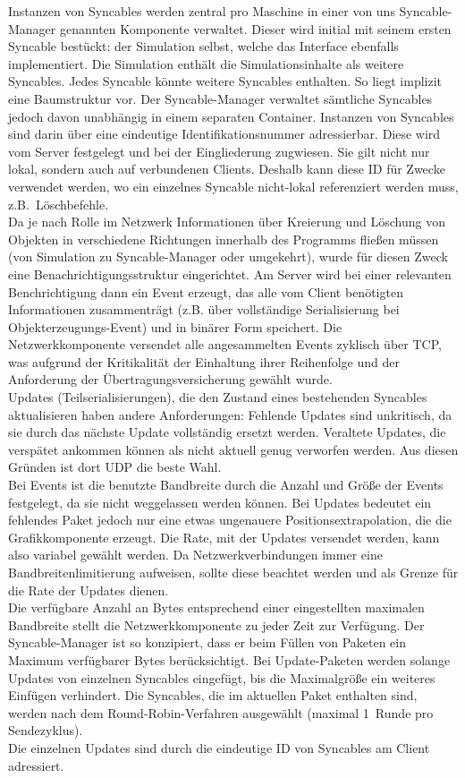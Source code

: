 Instanzen von Syncables werden zentral pro Maschine in einer von uns Syncable-Manager genannten Komponente verwaltet. 
Dieser wird initial mit seinem ersten Syncable bestückt: der Simulation selbst, welche das Interface ebenfalls implementiert. Die Simulation enthält die Simulationsinhalte als weitere Syncables. Jedes Syncable könnte weitere Syncables enthalten. So liegt implizit eine Baumstruktur vor. Der Syncable-Manager verwaltet sämtliche Syncables jedoch davon unabhängig in einem separaten Container. Instanzen von Syncables sind darin über eine eindeutige Identifikationsnummer adressierbar. Diese wird vom Server festgelegt und bei der Eingliederung zugwiesen. Sie gilt nicht nur lokal, sondern auch auf verbundenen Clients. Deshalb kann diese ID für Zwecke verwendet werden, wo ein einzelnes Syncable nicht-lokal referenziert werden muss, z.B.~Löschbefehle.\\
Da je nach Rolle im Netzwerk Informationen über Kreierung und Löschung von Objekten in verschiedene Richtungen innerhalb des Programms fließen müssen (von Simulation zu Syncable-Manager oder umgekehrt), wurde für diesen Zweck eine Benachrichtigungsstruktur eingerichtet. Am Server wird bei einer relevanten Benchrichtigung dann ein Event erzeugt, das alle vom Client benötigten Informationen zusammenträgt (z.B. über vollständige Serialisierung bei Objekterzeugungs-Event) und in binärer Form speichert. Die Netzwerkkomponente versendet alle angesammelten Events zyklisch über TCP, was aufgrund der Kritikalität der Einhaltung ihrer Reihenfolge und der Anforderung der Übertragungsversicherung gewählt wurde.\\
Updates (Teilserialisierungen), die den Zustand eines bestehenden Syncables aktualisieren haben andere Anforderungen: Fehlende Updates sind unkritisch, da sie durch das nächste Update vollständig ersetzt werden. Veraltete Updates, die verspätet ankommen können als nicht aktuell genug verworfen werden. Aus diesen Gründen ist dort UDP die beste Wahl.\\
Bei Events ist die benutzte Bandbreite durch die Anzahl und Größe der Events festgelegt, da sie nicht weggelassen werden können. Bei Updates bedeutet ein fehlendes Paket jedoch nur eine etwas ungenauere Positionsextrapolation, die die Grafikkomponente erzeugt. Die Rate, mit der Updates versendet werden, kann also variabel gewählt werden. Da Netzwerkverbindungen immer eine Bandbreitenlimitierung aufweisen, sollte diese beachtet werden und als Grenze für die Rate der Updates dienen.\\
Die verfügbare Anzahl an Bytes entsprechend einer eingestellten maximalen Bandbreite stellt die Netzwerkkomponente zu jeder Zeit zur Verfügung.
Der Syncable-Manager ist so konzipiert, dass er beim Füllen von Paketen ein Maximum verfügbarer Bytes berücksichtigt.
Bei Update-Paketen werden solange Updates von einzelnen Syncables eingefügt, bis die Maximalgröße ein weiteres Einfügen verhindert. Die Syncables, die im aktuellen Paket enthalten sind, werden nach dem Round-Robin-Verfahren ausgewählt (maximal 1~Runde pro Sendezyklus).\\
Die einzelnen Updates sind durch die eindeutige ID von Syncables am Client adressiert.


